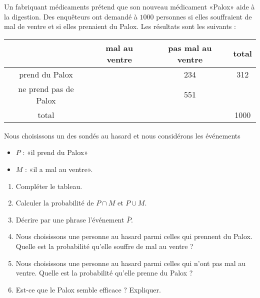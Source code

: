 
\begin{exercice}\label{exosmath-0720}


    Un fabriquant médicaments prétend que son nouveau médicament «Palox» aide à la digestion. Des enquêteurs ont demandé à \( 1000\) personnes si elles souffraient de mal de ventre et si elles prenaient du Palox. Les résultats sont les suivants :

    \begin{center}
    \begin{tabular}[]{|c|c|c|c|}
        \hline
        &mal au ventre&pas mal au ventre&total\\
        \hline
        prend du Palox&&234&312\\
        \hline
        ne prend pas de Palox&&551&\\
        \hline
        total&&&1000\\
        \hline
    \end{tabular}
    \end{center}

    \begin{multicols}{2}
    Nous choisissons un des sondés au hasard et nous considérons les événements
    \begin{itemize}
        \item \( P\) : «il prend du Palox» 
        \item   \( M\) : «il a mal au ventre».
    \end{itemize}
    \begin{enumerate}
        \item
            Compléter le tableau.
        \item
            Calculer la probabilité de \( P\cap M\) et \( P\cup M\).
        \item
            Décrire par une phrase l'événement \( \bar P\).
        \item
            Nous choisissons une personne au hasard parmi celles qui prennent du Palox. Quelle est la probabilité qu'elle souffre de mal au ventre ?
        \item
            Nous choisissons une personne au hasard parmi celles qui n'ont pas mal au ventre. Quelle est la probabilité qu'elle prenne du Palox ?
        \item
            Est-ce que le Palox semble efficace ? Expliquer.
    \end{enumerate}
    \end{multicols}

\end{exercice}
